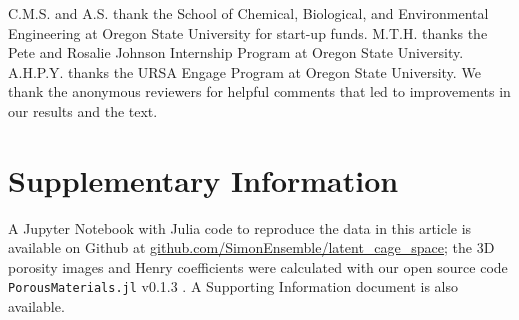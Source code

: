 \documentclass[journal=jacsat,manuscript=article,layout=traditional]{achemso}
\begin{document}
\begin{acknowledgement}


C.M.S. and A.S. thank the School of Chemical, Biological, and Environmental Engineering at Oregon State University for start-up funds. M.T.H. thanks the Pete and Rosalie Johnson Internship Program at Oregon State University. A.H.P.Y. thanks the URSA Engage Program at Oregon State University. {\color{red} We thank the anonymous reviewers for helpful comments that led to improvements in our results and the text.}

\end{acknowledgement}



\section{Supplementary Information} A Jupyter Notebook with Julia \cite{julia} code to reproduce the data in this article is available on Github at \url{github.com/SimonEnsemble/latent_cage_space}; the 3D porosity images and Henry coefficients were calculated with our open source code \texttt{PorousMaterials.jl} v0.1.3 \cite{PorousMaterialsJL}. A Supporting Information document is also available.


\end{document}
